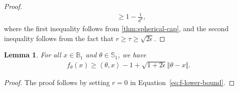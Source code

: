 \documentclass[letter, 12pt]{report}
\newcommand{\ip}[1]{\left \langle #1 \right \rangle}
\newcommand{\paren}[1]{\left( #1 \right)}
\newcommand{\norm}[1]{\left \Vert  #1 \right \Vert}
\newcommand{\bS}{\mathbb S}
\newcommand{\1}{\mathbf{1}}
\theoremstyle{plain}
\newtheorem{lemma}[theorem]{Lemma}
\theoremstyle{definition}
\theoremstyle{remark}
\begin{document}
\begin{proof}
\begin{align*}
         & \geq
        1 - \frac{1}{d^4}
        ,
    \end{align*}
    where the first inequality follows from \cref{thm:spherical-cap},
    and the second inequality follows from the fact that $r \geq \tau \geq \sqrt{2\epsilon}$.
\end{proof}

\begin{lemma}\label{lem:f-lower-bound}
    For all $x \in \mathbb{B}_1$ and $\theta \in \bS_1$, we have
    \begin{align*}
        f_\theta(x) \geq \ip{\theta, x} - 1 + \sqrt{1 + 2\epsilon}\norm{\theta - x}.
    \end{align*}
\end{lemma}
\begin{proof}
    The proof follows by setting $r=0$ in Equation~\eqref{eq:f-lower-bound}.
\end{proof}
\end{document}
